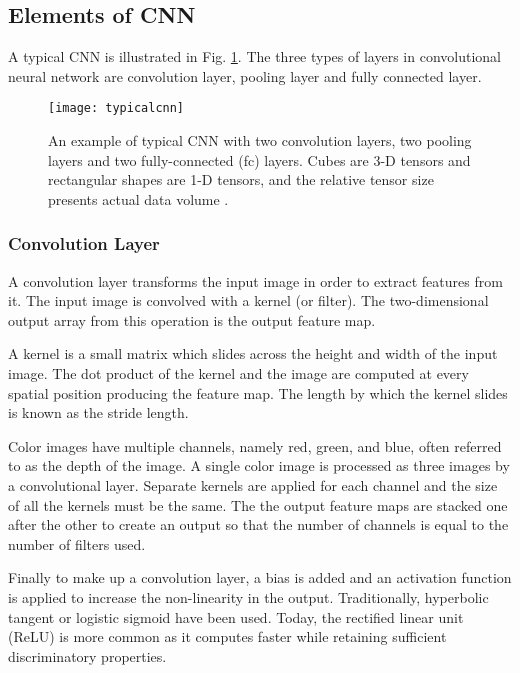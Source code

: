 \subsection{Elements of CNN}

A typical CNN is illustrated in Fig. \ref{typicalcnn}. The three types of layers in convolutional neural network are convolution layer, pooling layer and fully connected layer.

\begin{figure}[H]
\centering
\texttt{[image: typicalcnn]}
\caption{An example of typical CNN with two convolution
layers, two pooling layers and two fully-connected (fc) layers.
Cubes are 3-D tensors and rectangular shapes are 1-D tensors,
and the relative tensor size presents actual data volume \cite{Chen2016}.}
\label{typicalcnn}
\end{figure}


\subsubsection*{Convolution Layer}

A convolution layer transforms the input image in order to extract features from it.
The input image is convolved with a kernel (or filter).
The two-dimensional output array from this operation is the output feature map.

A kernel is a small matrix which slides across the height and width of the  input image.
The dot product of the kernel and the image are computed at every spatial position producing the feature map.
The length by which the kernel slides is known as the stride length.

Color images have multiple channels, namely red, green, and blue, often referred to as the depth of the image.
A single color image is processed as three images by a convolutional layer.
Separate kernels are applied for each channel and the size of all the kernels must be the same.
The the output feature maps are stacked one after the other to create an output so that the number of channels is equal to the number of filters used. 

Finally to make up a convolution layer, a bias is added and an activation function is applied to increase the non-linearity in the output.
Traditionally, hyperbolic tangent or logistic sigmoid have been used. Today,  the rectified linear unit (ReLU) is more common as it computes faster while retaining sufficient discriminatory properties.

